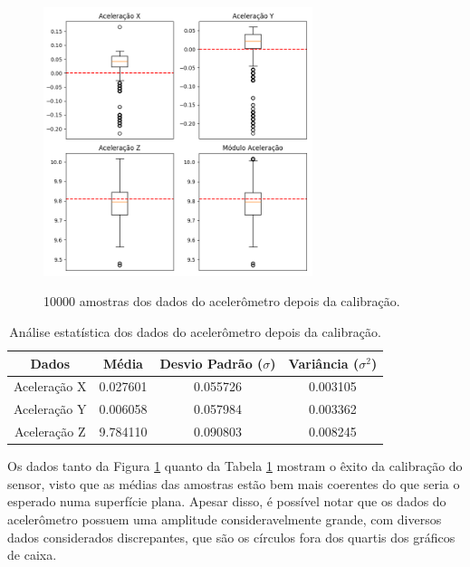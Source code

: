 \documentclass[acronym, symbols, table]{fei}
\begin{document}
	\begin{figure}[!htb]
		\centering
		\caption{10000 amostras dos dados do acelerômetro depois da calibração.}
		\includegraphics[width=0.7\textwidth]{dados_acelerometro_certos.png}
		\label{fig:dados_acelerometro_certos}
	\end{figure}
	
	\begin{table}[!htb]
		\centering
		\caption{Análise estatística dos dados do acelerômetro depois da calibração.}\label{tab:acelerometro_depois_calibracao}
		\begin{tabular}{|c|c|c|c|}
			\hline
			Dados & Média & Desvio Padrão ($\sigma$) & Variância ($\sigma^2$) \\ \hline
			\small Aceleração X & 0.027601  & 0.055726 & 0.003105 \\ \hline
			\small Aceleração Y & 0.006058  & 0.057984 & 0.003362 \\ \hline
			\small Aceleração Z & 9.784110  & 0.090803 & 0.008245 \\ \hline			
		\end{tabular}
	\end{table}
	
	Os dados tanto da Figura \ref{fig:dados_acelerometro_certos} quanto da Tabela \ref{tab:acelerometro_depois_calibracao} mostram o êxito da calibração do sensor, visto que as médias das amostras estão bem mais coerentes do que seria o esperado numa superfície plana. Apesar disso, é possível notar que os dados do acelerômetro possuem uma amplitude consideravelmente grande, com diversos dados considerados discrepantes, que são os círculos fora dos quartis dos gráficos de caixa.
	
\end{document}
